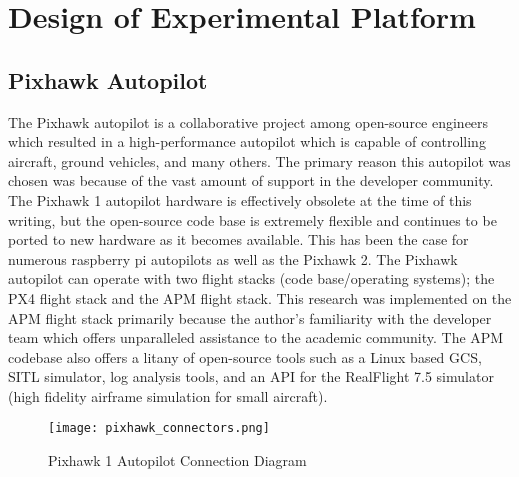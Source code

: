 \chapter{Design of Experimental Platform}\label{ch:platform}

\section{Pixhawk Autopilot}
The Pixhawk autopilot is a collaborative project among open-source engineers which resulted in a high-performance autopilot which is capable of controlling aircraft, ground vehicles, and many others.  The primary reason this autopilot was chosen was because of the vast amount of support in the developer community.  The Pixhawk 1 autopilot hardware is effectively obsolete at the time of this writing, but the open-source code base is extremely flexible and continues to be ported to new hardware as it becomes available.  This has been the case for numerous raspberry pi autopilots as well as the Pixhawk 2.  The Pixhawk autopilot can operate with two flight stacks (code base/operating systems); the PX4 flight stack and the \ac{APM} flight stack.  This research was implemented on the \ac{APM} flight stack primarily because the author's familiarity with the developer team which offers unparalleled assistance to the academic community.  The \ac{APM} codebase also offers a litany of open-source tools such as a Linux based \ac{GCS}, \ac{SITL} simulator, log analysis tools, and an \ac{API} for the RealFlight 7.5 simulator (high fidelity airframe simulation for small aircraft).

\begin{figure}[h!]
 \centering
  \texttt{[image: pixhawk\_connectors.png]}
  \caption{Pixhawk 1 Autopilot Connection Diagram}
  \label{fig:pixhawk_autopilot}
\end{figure}

